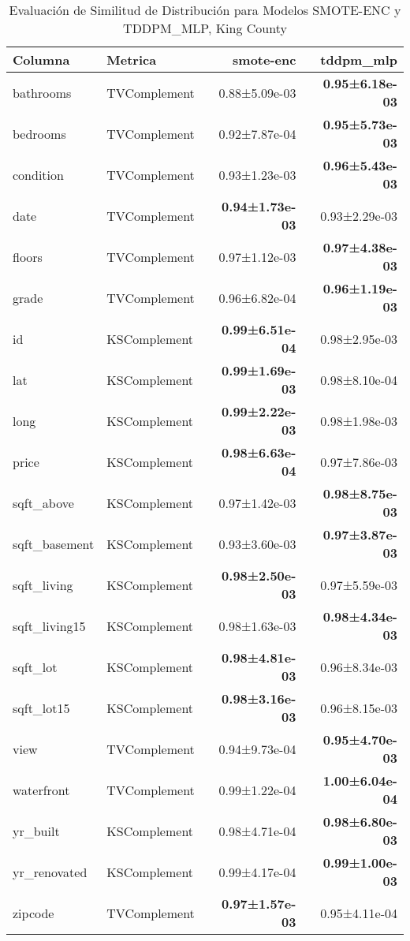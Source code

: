 \begin{table}[H]
\centering
\fontsize{10}{14}\selectfont
\caption{Evaluaci\'on de Similitud de Distribuci\'on para Modelos SMOTE-ENC y TDDPM\_MLP, King County}
\label{table-shape-king county-a}
\begin{tabular}{|l|l|r|r|}
\hline
\rowcolor[gray]{0.8}
Columna & Metrica & smote-enc & tddpm\_mlp \\
\hline bathrooms & TVComplement & 0.88±5.09e-03 & \bfseries 0.95±6.18e-03 \\
\hline bedrooms & TVComplement & 0.92±7.87e-04 & \bfseries 0.95±5.73e-03 \\
\hline condition & TVComplement & 0.93±1.23e-03 & \bfseries 0.96±5.43e-03 \\
\hline date & TVComplement & \bfseries 0.94±1.73e-03 & 0.93±2.29e-03 \\
\hline floors & TVComplement & 0.97±1.12e-03 & \bfseries 0.97±4.38e-03 \\
\hline grade & TVComplement & 0.96±6.82e-04 & \bfseries 0.96±1.19e-03 \\
\hline id & KSComplement & \bfseries 0.99±6.51e-04 & 0.98±2.95e-03 \\
\hline lat & KSComplement & \bfseries 0.99±1.69e-03 & 0.98±8.10e-04 \\
\hline long & KSComplement & \bfseries 0.99±2.22e-03 & 0.98±1.98e-03 \\
\hline price & KSComplement & \bfseries 0.98±6.63e-04 & 0.97±7.86e-03 \\
\hline sqft\_above & KSComplement & 0.97±1.42e-03 & \bfseries 0.98±8.75e-03 \\
\hline sqft\_basement & KSComplement & 0.93±3.60e-03 & \bfseries 0.97±3.87e-03 \\
\hline sqft\_living & KSComplement & \bfseries 0.98±2.50e-03 & 0.97±5.59e-03 \\
\hline sqft\_living15 & KSComplement & 0.98±1.63e-03 & \bfseries 0.98±4.34e-03 \\
\hline sqft\_lot & KSComplement & \bfseries 0.98±4.81e-03 & 0.96±8.34e-03 \\
\hline sqft\_lot15 & KSComplement & \bfseries 0.98±3.16e-03 & 0.96±8.15e-03 \\
\hline view & TVComplement & 0.94±9.73e-04 & \bfseries 0.95±4.70e-03 \\
\hline waterfront & TVComplement & 0.99±1.22e-04 & \bfseries 1.00±6.04e-04 \\
\hline yr\_built & KSComplement & 0.98±4.71e-04 & \bfseries 0.98±6.80e-03 \\
\hline yr\_renovated & KSComplement & 0.99±4.17e-04 & \bfseries 0.99±1.00e-03 \\
\hline zipcode & TVComplement & \bfseries 0.97±1.57e-03 & 0.95±4.11e-04 \\
\hline
\end{tabular}
\end{table}

